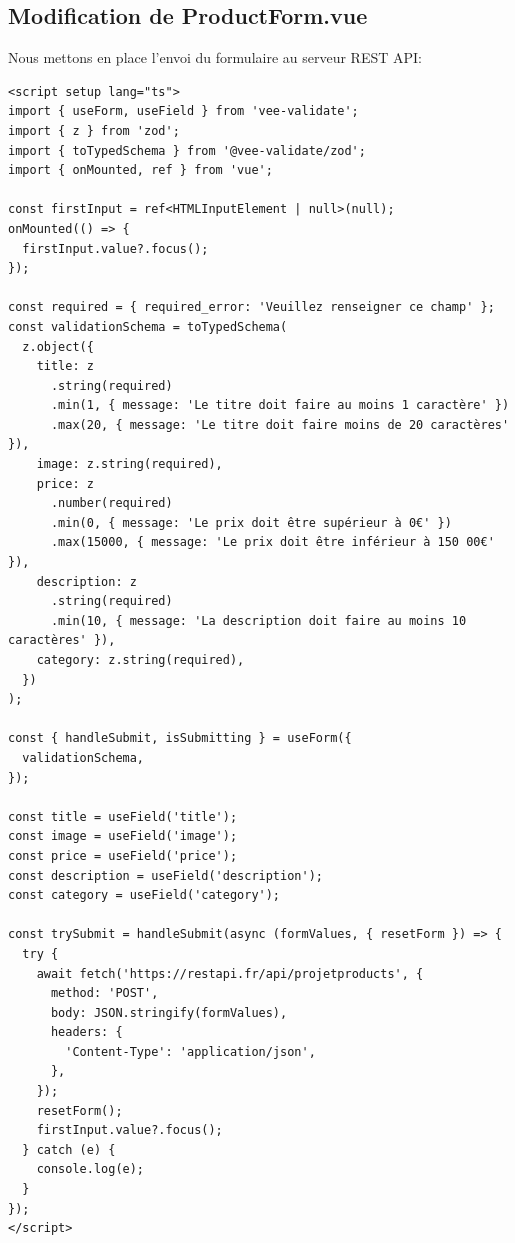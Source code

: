 \subsection{Modification de {\color{monOrange}ProductForm.vue}}
Nous mettons en place l'envoi du formulaire au serveur {\color{monOrange}REST API}:
\begin{verbatim}
<script setup lang="ts">
import { useForm, useField } from 'vee-validate';
import { z } from 'zod';
import { toTypedSchema } from '@vee-validate/zod';
import { onMounted, ref } from 'vue';

const firstInput = ref<HTMLInputElement | null>(null);
onMounted(() => {
  firstInput.value?.focus();
});

const required = { required_error: 'Veuillez renseigner ce champ' };
const validationSchema = toTypedSchema(
  z.object({
    title: z
      .string(required)
      .min(1, { message: 'Le titre doit faire au moins 1 caractère' })
      .max(20, { message: 'Le titre doit faire moins de 20 caractères' }),
    image: z.string(required),
    price: z
      .number(required)
      .min(0, { message: 'Le prix doit être supérieur à 0€' })
      .max(15000, { message: 'Le prix doit être inférieur à 150 00€' }),
    description: z
      .string(required)
      .min(10, { message: 'La description doit faire au moins 10 caractères' }),
    category: z.string(required),
  })
);

const { handleSubmit, isSubmitting } = useForm({
  validationSchema,
});

const title = useField('title');
const image = useField('image');
const price = useField('price');
const description = useField('description');
const category = useField('category');

const trySubmit = handleSubmit(async (formValues, { resetForm }) => {
  try {
    await fetch('https://restapi.fr/api/projetproducts', {
      method: 'POST',
      body: JSON.stringify(formValues),
      headers: {
        'Content-Type': 'application/json',
      },
    });
    resetForm();
    firstInput.value?.focus();
  } catch (e) {
    console.log(e);
  }
});
</script>


\end{verbatim}
